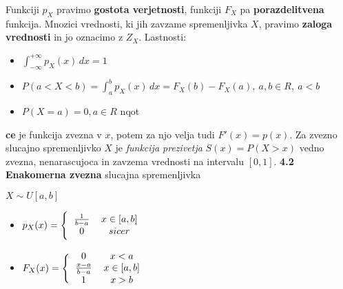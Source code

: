 \documentclass{article}
\begin{document}
\begin{multicols}{3}
Funkciji $p_{X}$ pravimo \textbf{gostota verjetnosti}, funkciji $F_{X}$ pa
\textbf{porazdelitvena} funkcija. Mnozici vrednosti, ki jih zavzame spremenljivka
$X$, pravimo \textbf{zaloga vrednosti} in jo oznacimo z $Z_{X}$.
Lastnosti:
\begin{itemize}
    \item \begin{math}
        \int_{- \infty}^{+ \infty} p_{X}(x) \,dx = 1
    \end{math}
    \item \begin{math}
        P(a < X < b) = \int_{a}^{b} p_{X}(x) \,dx = F_{X}(b) - F_{X}(a),\: a,b \in R,\: a < b
    \end{math}
    \item \begin{math}
        P(X = a) = 0, a \in R
    \end{math} nqot
\end{itemize}
\textbf{ce} je funkcija zvezna v $x$, potem za njo velja tudi $F'(x) = p(x)$.
Za zvezno slucajno spremenljivko $X$ je \textit{funkcija prezivetja} $S(x) = P(X > x)$
vedno zvezna, nenarascujoca in zavzema vrednosti na intervalu $[0, 1]$.
\textbf{4.2 Enakomerna zvezna} slucajna spremenljivka
\begin{center}
    \begin{math}
        X \sim U[a, b]
    \end{math}
\end{center}

\begin{itemize}
    \item  \begin{math}
        p_{X}(x) =
        \Bigg \{\begin{tabular}{ccc}
          $\frac{1}{b-a}$  & $x \in [a, b]$ & \\
          $0$ & $sicer$ & \\
        \end{tabular}
    \end{math} 
    
     \item \begin{math}
        F_{X}(x) =
        \Bigg \{\begin{tabular}{ccc}
          $0$ & $x < a$ & \\
          $\frac{x - a}{b - a}$  & $x \in [a, b]$ & \\
          $1$ & $x > b$  & \\
        \end{tabular}
    \end{math}
\end{itemize}


\end{multicols}
\end{document}
